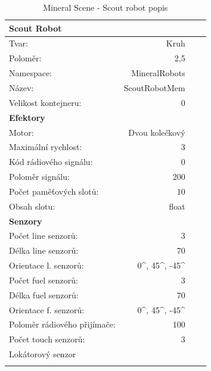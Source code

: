 \begin{table}[h]\centering
	\begin{tabular}{l@{\hspace{1.0cm}}D{.}{,}{2.2}D{.}{,}{2.2}D{.}{,}{2.3}}
		\toprule
		\textbf{Scout Robot} \\
		\midrule
		Tvar: & Kruh\\
		Poloměr: & 2,5\\
		Namespace: & MineralRobots\\
		Název: & ScoutRobotMem \\
		Velikost kontejneru: & 0\\
		\midrule
		\textbf{Efektory} \\
		\midrule
		Motor: & Dvou kolečkový \\
		Maximální rychlost: & 3 \\
		Kód rádiového signálu: & 0\\
		Poloměr signálu: & 200\\
		Počet paměťových slotů: &10 \\
		Obsah slotu: & float\\
		\midrule
		\textbf{Senzory} \\
		\midrule
		Počet line senzorů: &  3\\
		Délka line senzorů: & 70\\
		Orientace l. senzorů: & 0^\circ, 45^\circ, -45^\circ\\
		Počet fuel senzorů: &  3\\
		Délka fuel senzorů: & 70\\
		Orientace f. senzorů: & 0^\circ, 45^\circ, -45^\circ\\
		Poloměr rádiového přijímače: & 100 \\
		Počet touch senzorů: & 3 \\  
		Lokátorový senzor\\ 
		\bottomrule
	\end{tabular}
	\caption{Mineral Scene - Scout robot popis }
	\label{tab04:MineralScout}
\end{table}
\clearpage
